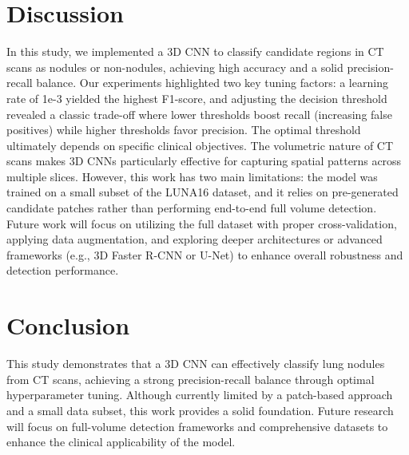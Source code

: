 \documentclass{IEEEtran}
\begin{document}
\section{Discussion}
In this study, we implemented a 3D CNN to classify candidate regions in CT scans as nodules or non-nodules, achieving high accuracy and a solid precision-recall balance. Our experiments highlighted two key tuning factors: a learning rate of 1e-3 yielded the highest F1-score, and adjusting the decision threshold revealed a classic trade-off where lower thresholds boost recall (increasing false positives) while higher thresholds favor precision. The optimal threshold ultimately depends on specific clinical objectives.
The volumetric nature of CT scans makes 3D CNNs particularly effective for capturing spatial patterns across multiple slices. However, this work has two main limitations: the model was trained on a small subset of the LUNA16 dataset, and it relies on pre-generated candidate patches rather than performing end-to-end full volume detection. 
Future work will focus on utilizing the full dataset with proper cross-validation, applying data augmentation, and exploring deeper architectures or advanced frameworks (e.g., 3D Faster R-CNN or U-Net) to enhance overall robustness and detection performance.
\section{Conclusion}
This study demonstrates that a 3D CNN can effectively classify lung nodules from CT scans, achieving a strong precision-recall balance through optimal hyperparameter tuning. Although currently limited by a patch-based approach and a small data subset, this work provides a solid foundation. Future research will focus on full-volume detection frameworks and comprehensive datasets to enhance the clinical applicability of the model.
\end{document}
